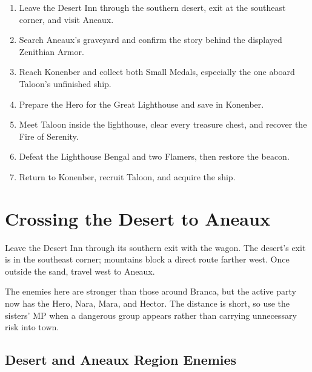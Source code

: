 \documentclass[
  american,
  10pt,
  letterpaper,
  oneside,
  open=any]{scrreprt}
\providecommand{\tightlist}{%
  \setlength{\itemsep}{0pt}\setlength{\parskip}{0pt}}
\begin{document}
\begin{enumerate}
\def\labelenumi{\arabic{enumi}.}
\tightlist
\item
  Leave the Desert Inn through the southern desert, exit at the
  southeast corner, and visit Aneaux.
\item
  Search Aneaux's graveyard and confirm the story behind the displayed
  Zenithian Armor.
\item
  Reach Konenber and collect both Small Medals, especially the one
  aboard Taloon's unfinished ship.
\item
  Prepare the Hero for the Great Lighthouse and save in Konenber.
\item
  Meet Taloon inside the lighthouse, clear every treasure chest, and
  recover the Fire of Serenity.
\item
  Defeat the Lighthouse Bengal and two Flamers, then restore the beacon.
\item
  Return to Konenber, recruit Taloon, and acquire the ship.
\end{enumerate}

\section{Crossing the Desert to
Aneaux}\label{crossing-the-desert-to-aneaux}

Leave the Desert Inn through its southern exit with the wagon. The
desert's exit is in the southeast corner; mountains block a direct route
farther west. Once outside the sand, travel west to Aneaux.

The enemies here are stronger than those around Branca, but the active
party now has the Hero, Nara, Mara, and Hector. The distance is short,
so use the sisters' MP when a dangerous group appears rather than
carrying unnecessary risk into town.

\subsection{Desert and Aneaux Region
Enemies}\label{desert-and-aneaux-region-enemies}
\end{document}
